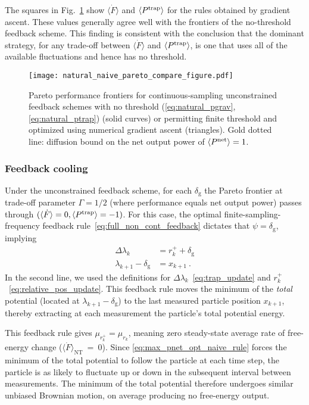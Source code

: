 \documentclass[%
reprint,
bibnotes, amsmath, amssymb, aps, pre,
 showkeys,
floatfix
]{revtex4-2}
\newcommand{\mrm}{\mathrm}
\newcommand{\dg}{\delta_{\mrm{g}}}
\newcommand{\dlk}{\Delta\lambda_{k}}
\newcommand{\xkp}{x_{k+1}}
\newcommand{\lkp}{\lambda_{k+1}}
\newcommand{\xkr}{r_{k}}
\newcommand{\xkpr}{r_{k}^{+}}
\newcommand{\ept}{\ev{P^{\mrm{trap}}}}
\newcommand{\epg}{\langle\dot{F}\rangle}
\newcommand{\epn}{\ev{P^{\mrm{net}}}}
\begin{document}
The squares in Fig.~\ref{fig:greedy_natural_compare} show $\epg$ and $\ept$ for the rules obtained by gradient ascent.  
These values generally agree well with the frontiers of the no-threshold feedback scheme.
This finding is consistent with the conclusion that the dominant strategy, for any trade-off between $\epg$ and $\ept$, is one that uses all of the available fluctuations and hence has no threshold.

\begin{figure}[htbp]
    \centering
    \texttt{[image: natural\_naive\_pareto\_compare\_figure.pdf]}
    \caption{
        Pareto performance frontiers for continuous-sampling unconstrained feedback schemes with no threshold 
        (\ref{eq:natural_pgrav}, \ref{eq:natural_ptrap}) (solid curves) or permitting finite threshold and optimized using numerical gradient ascent (triangles).
        Gold dotted line: diffusion bound on the net output power of $\epn = 1$.
        }
    \label{fig:greedy_natural_compare}
\end{figure}


\subsubsection{Feedback cooling}

Under the unconstrained feedback scheme, for each $\dg$ the Pareto frontier at trade-off parameter $\Gamma=1/2$ (where performance equals net output power) passes through $(\epg = 0, \ept = -1)$.
For this case, the optimal finite-sampling-frequency feedback rule~\eqref{eq:full_non_cont_feedback} dictates that $\psi = \dg$, implying
\begin{subequations}\label{eq:max_pnet_opt_naive_rule}
    \begin{align}
        \dlk &= \xkpr + \dg\\
        \lkp - \dg &= \xkp\ .
    \end{align}
\end{subequations}
In the second line, we used the definitions for $\dlk$~\eqref{eq:trap_update} and $\xkpr$~\eqref{eq:relative_pos_update}.
This feedback rule moves the minimum of the \emph{total} potential (located at $\lkp-\dg$) to the last measured particle position $\xkp$, thereby extracting at each measurement the particle's total potential energy.

This feedback rule gives $\mu_{\xkpr} = \mu_{\xkr}$, meaning zero steady-state average rate of free-energy change ($\epg_{\mrm{NT}}~=~0$).
Since \eqref{eq:max_pnet_opt_naive_rule} forces the minimum of the total potential to follow the particle at each time step, the particle is as likely to fluctuate up or down in the subsequent interval between measurements.
The minimum of the total potential therefore undergoes similar unbiased Brownian motion, on average producing no free-energy output.
\end{document}
